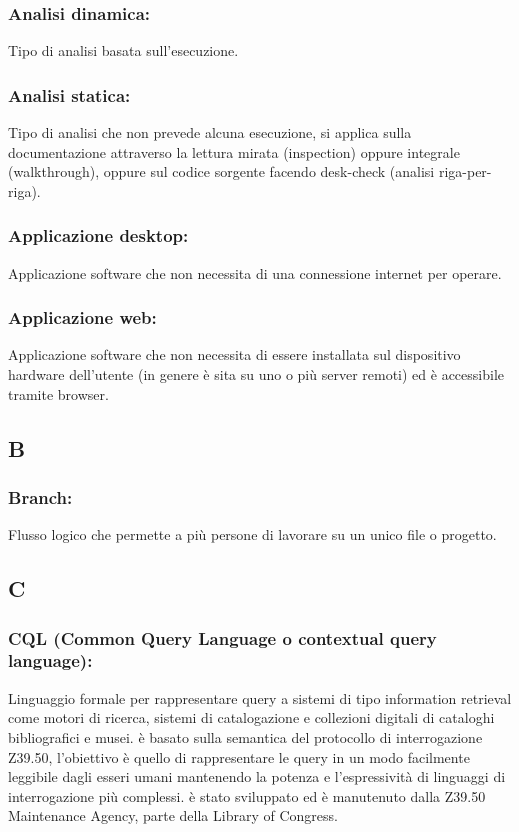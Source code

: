 \subsubsection*{Analisi dinamica:} Tipo di analisi basata
sull'esecuzione.
\subsubsection*{Analisi statica:} Tipo di analisi che non
prevede alcuna esecuzione, si applica sulla documentazione attraverso 
la lettura mirata (inspection) oppure integrale (walkthrough), 
oppure sul codice sorgente facendo desk-check (analisi riga-per-riga).

\subsubsection*{Applicazione desktop:} Applicazione software che non necessita
di una connessione internet per operare.

\subsubsection*{Applicazione web:} Applicazione software che non necessita di
essere installata sul dispositivo hardware dell'utente (in genere \`e sita su uno o pi\`u server
remoti) ed \`e accessibile tramite browser.

\subsection*{\huge{B}}
\subsubsection*{Branch:}  Flusso logico che permette a pi\`u persone di lavorare
su un unico file o progetto.
\subsection*{\huge{C}}
\subsubsection*{CQL (Common Query Language o contextual query language):}
Linguaggio formale per rappresentare query a sistemi di tipo information
retrieval come motori di ricerca, sistemi di catalogazione e collezioni digitali di cataloghi
bibliografici e musei. \`e basato sulla semantica del protocollo di interrogazione
Z39.50, l'obiettivo \`e quello di rappresentare le query in un modo facilmente
leggibile dagli esseri umani mantenendo la potenza e l'espressivit\`a di linguaggi
di interrogazione pi\`u complessi. \`e stato sviluppato ed \`e manutenuto dalla Z39.50
Maintenance Agency, parte della Library of Congress.

